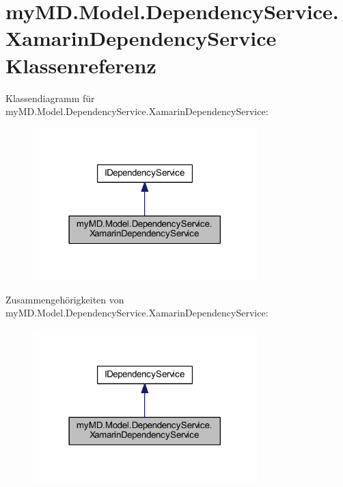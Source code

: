 \hypertarget{classmy_m_d_1_1_model_1_1_dependency_service_1_1_xamarin_dependency_service}{}\section{my\+M\+D.\+Model.\+Dependency\+Service.\+Xamarin\+Dependency\+Service Klassenreferenz}
\label{classmy_m_d_1_1_model_1_1_dependency_service_1_1_xamarin_dependency_service}


Klassendiagramm für my\+M\+D.\+Model.\+Dependency\+Service.\+Xamarin\+Dependency\+Service\+:
\nopagebreak
\begin{figure}[H]
\begin{center}
\leavevmode
\includegraphics[width=246pt]{classmy_m_d_1_1_model_1_1_dependency_service_1_1_xamarin_dependency_service__inherit__graph}
\end{center}
\end{figure}


Zusammengehörigkeiten von my\+M\+D.\+Model.\+Dependency\+Service.\+Xamarin\+Dependency\+Service\+:
\nopagebreak
\begin{figure}[H]
\begin{center}
\leavevmode
\includegraphics[width=246pt]{classmy_m_d_1_1_model_1_1_dependency_service_1_1_xamarin_dependency_service__coll__graph}
\end{center}
\end{figure}
